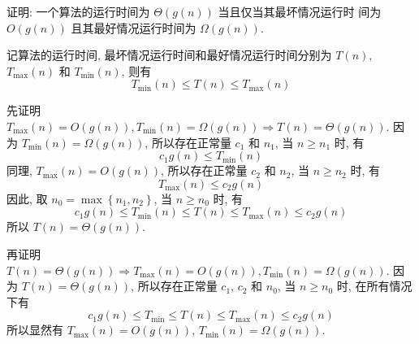 \documentclass[boxes]{homework}
\begin{document}
\begin{problem}
证明: 一个算法的运行时间为 $\Theta \left( g(n)\right)$ 当且仅当其最坏情况运行时
间为 $O \left( g(n)\right)$ 且其最好情况运行时间为 $\Omega \left( g(n)\right)$.
\end{problem}
\begin{solution}
    记算法的运行时间, 最坏情况运行时间和最好情况运行时间分别为 $T(n)$, $T_{\max
            }(n)$ 和 $T_{\min}(n)$, 则有
    \begin{equation}
        T_{\min}(n) \leqslant T(n) \leqslant T_{\max}(n)
    \end{equation}

    先证明 $T_{\max}(n) = O(g(n)), T_{\min}(n) = \Omega(g(n))
        \Rightarrow T(n) = \Theta(g(n))$.
    因为 $T_{\min}(n) = \Omega \left( g(n)\right)$, 所以存在正常量 $c_{1}$ 和
    $n_{1}$, 当 $n \geqslant n_{1}$ 时, 有
    \begin{equation}
        c_{1} g(n) \leqslant T_{\min}(n)
    \end{equation}
    同理, $T_{\max}(n) = O \left( g(n)\right)$, 所以存在正常量 $c_{2}$ 和
    $n_{2}$, 当 $n \geqslant n_{2}$ 时, 有
    \begin{equation}
        T_{\max}(n) \leqslant c_{2} g(n)
    \end{equation}
    因此, 取 $n_{0} = \max \left\{ n_{1}, n_{2}\right\}$, 当 $n \geqslant
        n_{0}$ 时, 有
    \begin{equation}
        c_{1} g(n) \leqslant T_{\min}(n) \leqslant T(n) \leqslant T_{\max}(n)
        \leqslant c_{2} g(n)
    \end{equation}
    所以 $T(n) = \Theta \left( g(n)\right)$.

    再证明 $T(n) = \Theta(g(n)) \Rightarrow T_{\max}(n) = O(g(n)),
        T_{\min}(n) = \Omega(g(n))$.
    因为 $T(n) = \Theta \left( g(n)\right)$, 所以存在正常量 $c_{1}$, $c_{2}$ 和
    $n_{0}$, 当 $n \geqslant n_{0}$ 时, 在所有情况下有
    \begin{equation}
        c_{1} g(n) \leqslant T_{\min} \leqslant T(n) \leqslant T_{\max}(n)
        \leqslant c_{2} g(n)
    \end{equation}
    所以显然有 $T_{\max}(n) = O(g(n))$, $T_{\min}(n) = \Omega(g(n))$.
\end{solution}
\end{document}
